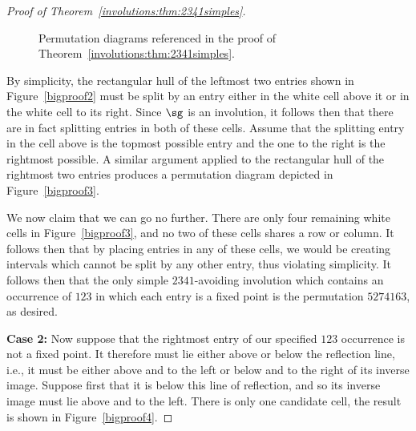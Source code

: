 \documentclass[12pt,twoside]{memoir}
\begin{document}
\begin{proof}[Proof of Theorem~\ref{involutions:thm:2341simples}]
\begin{figure}
            \caption{Permutation diagrams referenced in the
                     proof of Theorem~\ref{involutions:thm:2341simples}.}
            \label{figure:6_1-group-1} 
          \end{figure}

          By simplicity, the rectangular hull of the leftmost two entries shown
          in Figure~\ref{bigproof2} must be split by an entry either in the white
          cell above it or in the white cell to its right. Since $\sg$ is an
          involution, it follows then that there are in fact splitting entries in
          both of these cells. Assume that the splitting entry in the cell above
          is the topmost possible entry and the one to the right is the rightmost
          possible. A similar argument applied to the rectangular hull of the
          rightmost two entries produces a permutation diagram depicted in
          Figure~\ref{bigproof3}. 

          We now claim that we can go no further. There are only four remaining
          white cells in Figure~\ref{bigproof3}, and no two of these cells shares
          a row or column. It follows then that by placing entries in any of
          these cells, we would be creating intervals which cannot be split by
          any other entry, thus violating simplicity. It follows then that the
          only simple $2341$-avoiding involution which contains an occurrence of
          $123$ in which each entry is a fixed point is the permutation
          $5274163$, as desired. 
          

          \textbf{Case 2:}
          Now suppose that the rightmost entry of our specified $123$ occurrence
          is not a fixed point. It therefore must lie either above or below the
          reflection line, i.e., it must be either above and to the left or
          below and to the right of its inverse image. Suppose first that it is
          below this line of reflection, and so its inverse image must lie above
          and to the left. There is only one candidate cell, the result is shown
          in Figure~\ref{bigproof4}.



\end{proof}
\end{document}
